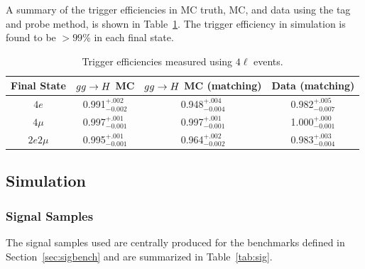 A summary of the trigger efficiencies in MC truth, MC, and data using the tag and probe method, is shown in Table~\ref{tab:TrigEff}. The trigger
efficiency in simulation is found to be $>99\%$ in each final state.

\begin{table}[h]
    \centering
    \begin{tabular}{c|c|c|c} 
\hline %
Final State  & $gg\to H$ MC & $gg\to H$ MC (matching)  & Data (matching)   \\
\hline %
$4e$  & 0.991$^{+.002}_{-0.002}$ & 0.948$^{+.004}_{-0.004}$ & 0.982$^{+.005}_{-0.007}$ \\
$4\mu$  & 0.997$^{+.001}_{-0.001}$ & 0.997$^{+.001}_{-0.001}$ & 1.000$^{+.000}_{-0.001}$ \\
$2e2\mu$  & 0.995$^{+.001}_{-0.001}$ & 0.964$^{+.002}_{-0.002}$ & 0.983$^{+.003}_{-0.004}$ \\
\hline %
    \end{tabular}
    \caption{Trigger efficiencies measured using $4\ell$ events.}
    \label{tab:TrigEff}
\end{table}

\subsection{Simulation}

\subsubsection{Signal Samples}

The signal samples used are centrally produced for the benchmarks defined in Section~\ref{sec:sigbench} and are summarized in Table~\ref{tab:sig}.

\begin{table}
\caption{Benchmark signal samples analyzed.}\label{tab:sig}
\end{table}

